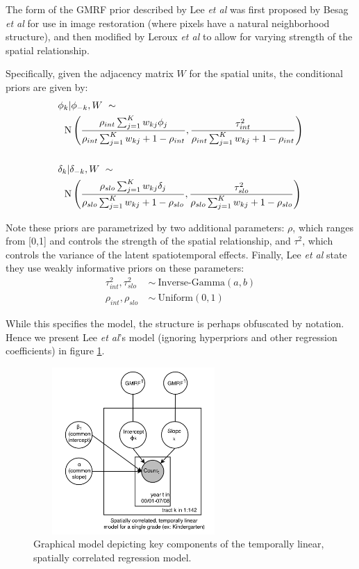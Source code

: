 \documentclass[journal]{IEEEtran}
\begin{document}
The form of the GMRF prior described by Lee \emph{et al} was first proposed by Besag \emph{et al} \cite{besag1991bayesian} for use in image restoration (where pixels have a natural neighborhood structure), and then modified by Leroux \emph{et al} \cite{leroux2000estimation} to allow for varying strength of the spatial relationship.

Specifically, given the adjacency matrix $W$ for the spatial units, the conditional priors are given by:
\begin{align*}
    & \phi_k | \boldmath{\phi}_{-k}, \boldmath{W}  ~ \sim \\
    &~~\textrm{N}\left(\frac{\rho_{int}\sum_{j = 1}^K w_{kj}\phi_j}{\rho_{int}\sum_{j = 1}^K w_{kj} + 1 - \rho_{int}}, \frac{\tau_{int}^2}{\rho_{int}\sum_{j = 1}^K w_{kj} + 1 - \rho_{int}}\right) \\ 
    &~\\
    &\delta_k | \boldmath{\delta}_{-k}, \boldmath{W}  ~ \sim\\
    &~~\textrm{N}\left(\frac{\rho_{slo}\sum_{j = 1}^K w_{kj}\delta_j}{\rho_{slo}\sum_{j = 1}^K w_{kj} + 1 - \rho_{slo}}, \frac{\tau_{slo}^2}{\rho_{slo}\sum_{j = 1}^K w_{kj} + 1 - \rho_{slo}}\right)
\end{align*}

Note these priors are parametrized by two additional parameters: $\rho$, which ranges from [0,1] and controls the strength of the spatial relationship, and $\tau^2$, which controls the variance of the latent spatiotemporal effects. Finally, Lee \emph{et al} state they use weakly informative priors on these parameters:
\begin{align*}
    \tau_{int}^2, \tau_{slo}^2 ~&\sim~ \textrm{Inverse-Gamma}(a,b) \\
    \rho_{int}, \rho_{slo} ~&\sim~ \textrm{Uniform}(0,1)
\end{align*}

While this specifies the model, the structure is perhaps obfuscated by notation. Hence we present Lee \emph{et al}'s model (ignoring hyperpriors and other regression coefficients) in figure \ref{fig:plate_model_1}.

\begin{figure}[h!]
    \centering
    \includegraphics[width=3in,height=2.5in,clip,keepaspectratio]{plate_model_1.png}
    \caption{Graphical model depicting key components of the temporally linear, spatially correlated regression model.}
    \label{fig:plate_model_1}
\end{figure}
\end{document}
